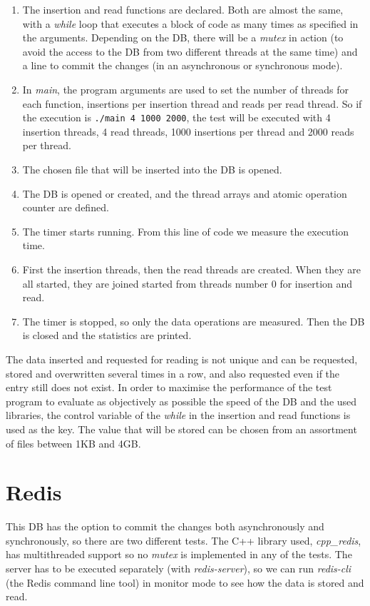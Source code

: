 \documentclass[11pt]{article}
\begin{document}
\begin{enumerate}
    \item The insertion and read functions are declared. Both are almost the same, with a \textit{while} loop that executes a block of code as many times as specified in the arguments. Depending on the DB, there will be a \textit{mutex} in action (to avoid the access to the DB from two different threads at the same time) and a line to commit the changes (in an asynchronous or synchronous mode).
    \item In \textit{main}, the program arguments are used to set the number of threads for each function, insertions per insertion thread and reads per read thread. So if the execution is \texttt{./main 4 1000 2000}, the test will be executed with 4 insertion threads, 4 read threads, 1000 insertions per thread and 2000 reads per thread.
    \item The chosen file that will be inserted into the DB is opened.
    \item The DB is opened or created, and the thread arrays and atomic operation counter are defined.
    \item The timer starts running. From this line of code we measure the execution time.
    \item First the insertion threads, then the read threads are created. When they are all started, they are joined started from threads number 0 for insertion and read.
    \item The timer is stopped, so only the data operations are measured. Then the DB is closed and the statistics are printed.
\end{enumerate}

The data inserted and requested for reading is not unique and can be requested, stored and overwritten several times in a row, and also requested even if the entry still does not exist. In order to maximise the performance of the test program to evaluate as objectively as possible the speed of the DB and the used libraries, the control variable of the \textit{while} in the insertion and read functions is used as the key. The value that will be stored can be chosen from an assortment of files between 1KB and 4GB.


\section{Redis}

This DB has the option to commit the changes both asynchronously and synchronously, so there are two different tests. The C++ library used, \textit{cpp\_redis}, has multithreaded support so no \textit{mutex} is implemented in any of the tests. The server has to be executed separately (with \textit{redis-server}), so we can run \textit{redis-cli} (the Redis command line tool) in monitor mode to see how the data is stored and read.
\end{document}
